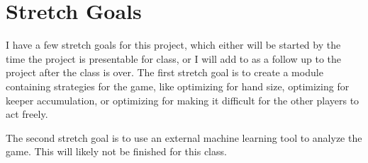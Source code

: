 \documentclass[10pt,letterpaper, twocolumn, science]{revtex4}
\begin{document}
\section{Stretch Goals}

I have a few stretch goals for this project, which either will be started by the time the project is presentable for class, or I will add to as a follow up to the project after the class is over. The first stretch goal is to create a module containing strategies for the game, like optimizing for hand size, optimizing for keeper accumulation, or optimizing for making it difficult for the other players to act freely.

The second stretch goal is to use an external machine learning tool to analyze the game. This will likely not be finished for this class.


\end{document}
